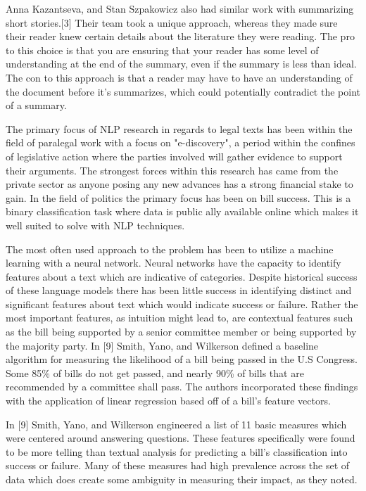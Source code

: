 \documentclass[11pt,a4paper]{article}
\begin{document}
Anna Kazantseva, and Stan Szpakowicz also had similar work with summarizing short stories.[3] Their team took a unique approach, whereas they made sure their reader knew certain details about the literature they were reading. The pro to this choice is that you are ensuring that your reader has some level of understanding at the end of the summary, even if the summary is less than ideal. The con to this approach is that a reader may have to have an understanding of the document before it’s summarizes, which could potentially contradict the point of a summary.  

The primary focus of NLP research in regards to legal texts has been within the field of paralegal work with a focus on "e-discovery", a  period within the confines of legislative action where the parties involved will gather evidence to support their arguments. The strongest forces within this research has came from the private sector as anyone posing any new advances has a strong financial stake to gain. In the field of politics the primary focus has been on bill success. This is a binary classification task where data is public ally available online which makes it well suited to solve with NLP techniques.

The most often used approach to the problem has been to utilize a machine learning with a neural network. Neural networks have the capacity to identify features about a text which are indicative of categories. Despite historical success of these language models there has been little success in identifying distinct and significant features about text which would indicate success or failure. Rather the most important features, as intuition might lead to, are contextual features such as the bill being supported by a senior committee member or being supported by the majority party.
In [9] Smith, Yano, and Wilkerson defined a baseline algorithm for measuring the likelihood of a bill being passed in the U.S Congress. Some 85\% of bills do not get passed, and nearly 90\% of bills that are recommended by a committee shall pass. The authors incorporated these findings with the application of linear regression based off of a bill's feature vectors.

In [9] Smith, Yano, and Wilkerson engineered a list of 11 basic measures which were centered around answering questions. These features specifically were found to be more telling than textual analysis for predicting a bill's classification into success or failure. Many of these measures had high prevalence across the set of data which does create some ambiguity in measuring their impact, as they noted.
\end{document}

